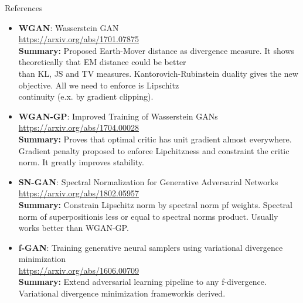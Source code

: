 \begin{frame}{References}
{\scriptsize
\begin{itemize}
	
	\item \textbf{WGAN}: Wasserstein GAN \\
	\href{https://arxiv.org/abs/1701.07875}{https://arxiv.org/abs/1701.07875} \\
	\textbf{Summary:} Proposed Earth-Mover distance as divergence measure. It shows theoretically that EM distance could be better \\ than KL, JS and TV measures. Kantorovich-Rubinstein duality gives the new objective. All we need to enforce is Lipschitz \\ continuity (e.x. by gradient clipping).
	
	\item \textbf{WGAN-GP}: Improved Training of Wasserstein GANs \\
	\href{https://arxiv.org/abs/1704.00028}{https://arxiv.org/abs/1704.00028} \\
	\textbf{Summary:} Proves that optimal critic has unit gradient almost everywhere. Gradient penalty proposed to enforce Lipchitzness and constraint the critic norm. It greatly improves stability.
	
	\item \textbf{SN-GAN}: Spectral Normalization for Generative Adversarial Networks \\
	\href{https://arxiv.org/abs/1802.05957}{https://arxiv.org/abs/1802.05957} \\
	\textbf{Summary:} Constrain Lipschitz norm by spectral norm pf weights. Spectral norm of superpositionis less or equal to spectral norms product. Usually works better than WGAN-GP. 
	
	\item \textbf{f-GAN}:  Training generative neural samplers using variational divergence minimization  \\
	\href{https://arxiv.org/abs/1606.00709}{https://arxiv.org/abs/1606.00709} \\
	\textbf{Summary:} Extend adversarial learning pipeline to any f-divergence. Variational divergence minimization frameworkis derived. 
	
\end{itemize}
}
\end{frame}
 